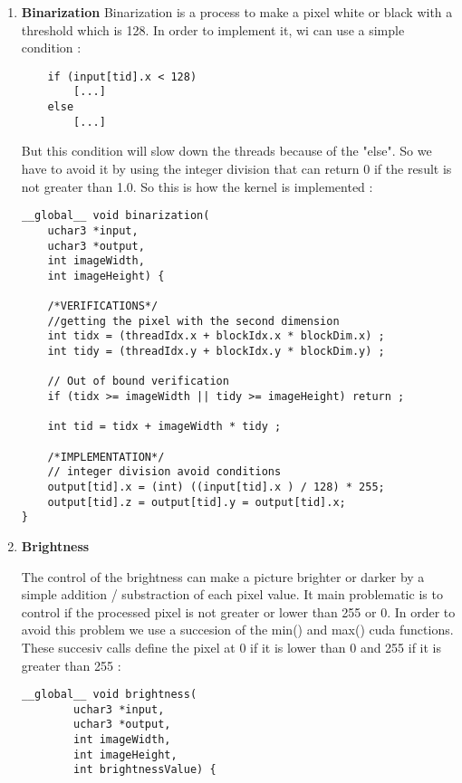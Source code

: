 \documentclass{article}
\begin{document}
    \begin{enumerate}     

    \item \textbf{Binarization}
    \newline Binarization is a process to make a pixel white or black with a threshold which is 128. In order to implement it, wi can use a simple condition : 
    \begin{verbatim}
    if (input[tid].x < 128)
        [...]
    else 
        [...]
    \end{verbatim}
    
    But this condition will slow down the threads because of the "else". So we have to avoid it by using the integer division that can return 0 if the result is not greater than 1.0. So this is how the kernel is implemented :
    
    \begin{verbatim}
__global__ void binarization(
    uchar3 *input, 
    uchar3 *output, 
    int imageWidth, 
    int imageHeight) {
	
    /*VERIFICATIONS*/
    //getting the pixel with the second dimension
    int tidx = (threadIdx.x + blockIdx.x * blockDim.x) ; 
    int tidy = (threadIdx.y + blockIdx.y * blockDim.y) ;
    	
    // Out of bound verification
    if (tidx >= imageWidth || tidy >= imageHeight) return ;
    	
    int tid = tidx + imageWidth * tidy ;
	
    /*IMPLEMENTATION*/
    // integer division avoid conditions
    output[tid].x = (int) ((input[tid].x ) / 128) * 255;
    output[tid].z = output[tid].y = output[tid].x;
}
    \end{verbatim}
    
    \item \textbf{Brightness}
    
    The control of the brightness can make a picture brighter or darker by a simple addition / substraction of each pixel value. It main problematic is to control if the processed pixel is not greater or lower than 255 or 0.
    In order to avoid this problem we use a succesion of the min() and max() cuda functions. These succesiv calls define the pixel at 0 if it is lower than 0 and 255 if it is greater than 255 :
    
    \begin{verbatim}
__global__ void brightness(
        uchar3 *input, 
        uchar3 *output, 
        int imageWidth, 
        int imageHeight, 
        int brightnessValue) {
	

\end{verbatim}
\end{enumerate}
\end{document}
